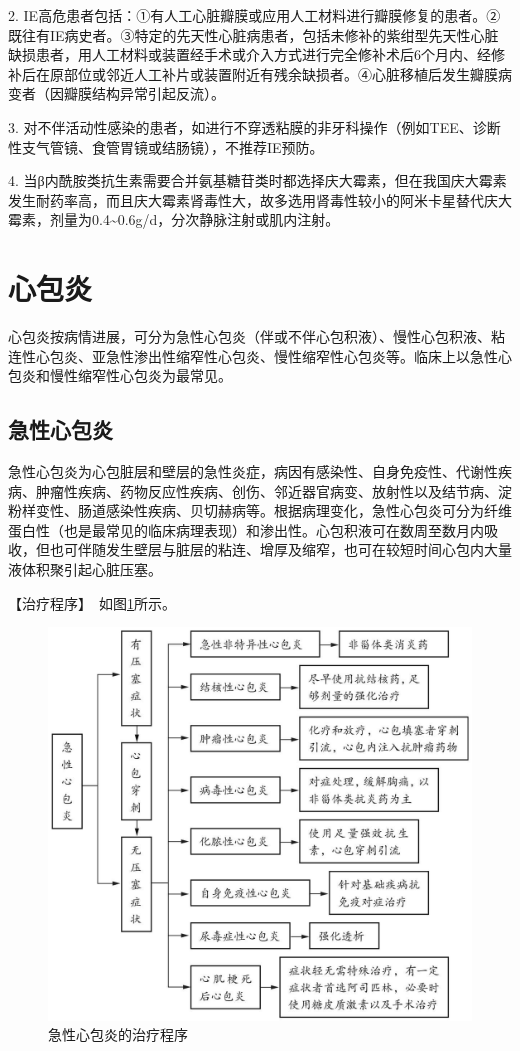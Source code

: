 2.
IE高危患者包括：①有人工心脏瓣膜或应用人工材料进行瓣膜修复的患者。②既往有IE病史者。③特定的先天性心脏病患者，包括未修补的紫绀型先天性心脏缺损患者，用人工材料或装置经手术或介入方式进行完全修补术后6个月内、经修补后在原部位或邻近人工补片或装置附近有残余缺损者。④心脏移植后发生瓣膜病变者（因瓣膜结构异常引起反流）。

3.
对不伴活动性感染的患者，如进行不穿透粘膜的非牙科操作（例如TEE、诊断性支气管镜、食管胃镜或结肠镜），不推荐IE预防。

4.
当β内酰胺类抗生素需要合并氨基糖苷类时都选择庆大霉素，但在我国庆大霉素发生耐药率高，而且庆大霉素肾毒性大，故多选用肾毒性较小的阿米卡星替代庆大霉素，剂量为0.4\textasciitilde{}0.6g/d，分次静脉注射或肌内注射。


\section{心包炎}

心包炎按病情进展，可分为急性心包炎（伴或不伴心包积液）、慢性心包积液、粘连性心包炎、亚急性渗出性缩窄性心包炎、慢性缩窄性心包炎等。临床上以急性心包炎和慢性缩窄性心包炎为最常见。

\subsection{急性心包炎}

急性心包炎为心包脏层和壁层的急性炎症，病因有感染性、自身免疫性、代谢性疾病、肿瘤性疾病、药物反应性疾病、创伤、邻近器官病变、放射性以及结节病、淀粉样变性、肠道感染性疾病、贝切赫病等。根据病理变化，急性心包炎可分为纤维蛋白性（也是最常见的临床病理表现）和渗出性。心包积液可在数周至数月内吸收，但也可伴随发生壁层与脏层的粘连、增厚及缩窄，也可在较短时间心包内大量液体积聚引起心脏压塞。

【治疗程序】　如图\ref{fig2-11-1}所示。

\begin{figure}[!htbp]
 \centering
 \includegraphics{./images/Image00079.jpg}
 \captionsetup{justification=centering}
 \caption{急性心包炎的治疗程序}
 \label{fig2-11-1}
  \end{figure} 

